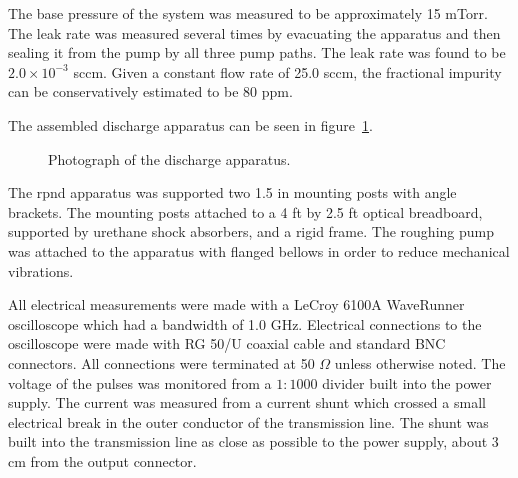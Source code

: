 The base pressure of the system was measured to be approximately 15 mTorr. The
leak rate was measured several times by evacuating the apparatus and then
sealing it from the pump by all three pump paths. The leak rate was found to be
$2.0\times 10^{-3}$ sccm. Given a constant flow rate of 25.0 sccm, the
fractional impurity can be conservatively estimated to be 80 ppm.

The assembled discharge apparatus can be seen in figure~\ref{fig:appphoto}.
\begin{figure}
  \centering
  \setlength\fboxsep{0pt}
  \setlength\fboxrule{1.0pt}
  \caption{Photograph of the discharge apparatus.}
  \label{fig:appphoto}
\end{figure}
The \acs{rpnd} apparatus was supported two 1.5 in mounting posts with angle
brackets. The mounting posts attached to a 4 ft by 2.5 ft optical breadboard,
supported by urethane shock absorbers, and a rigid frame. The roughing pump was
attached to the apparatus with flanged bellows in order to reduce mechanical
vibrations.

All electrical measurements were made with a LeCroy 6100A WaveRunner
oscilloscope which had a bandwidth of 1.0 GHz. Electrical connections to the
oscilloscope were made with RG 50/U coaxial cable and standard BNC connectors.
All connections were terminated at 50 $\Omega$ unless otherwise noted. The
voltage of the pulses was monitored from a $1:1000$ divider built into the power
supply. The current was measured from a current shunt which crossed a small
electrical break in the outer conductor of the transmission line. The shunt was
built into the transmission line as close as possible to the power supply, about
3 cm from the output connector.

